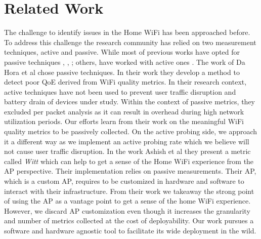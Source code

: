 \section{Related Work}\label{Back_Related_Work}

The challenge to identify issues in the Home WiFi has been approached before. To address this challenge the research community has relied on two measurement techniques, active and passive. While most of previous works have opted for passive techniques \cite{hostview}, \cite{passive_wifi_capacity_estimation}, \cite{observing_through_wifi_APs}; others, have worked with active ones \cite{can_user_level_probing}. The work of Da Hora et al \cite{passive_wifi_capacity_estimation} chose passive techniques. In their work they develop  a method to detect poor QoE derived from WiFi quality metrics. In their research context, active techniques have not been used to prevent user traffic disruption and battery drain of devices under study. Within the context of passive metrics, they excluded per packet analysis as it can result in overhead during high network utilization periods. Our efforts learn from their work on the meaningful WiFi quality metrics to be passively collected. On the active probing side, we approach it a different way as we implement an active probing rate which we believe will not cause user traffic disruption. In the work Ashish et al \cite{observing_through_wifi_APs} they present a metric called \emph{Witt} which can help to get a sense of the Home WiFi experience from the AP perspective. Their implementation relies on passive measurements. Their AP, which is a custom AP, requires to be customized in hardware and software to interact with their infrastructure. From their work we takeaway the strong point of using the AP as a vantage point to get a sense of the home WiFi experience. However, we discard AP customization even though it increases the granularity and number of metrics collected at the cost of deployability. Our work pursues a software and hardware agnostic tool to facilitate its wide deployment in the wild.
